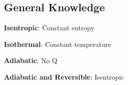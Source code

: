 \documentclass{article}
\begin{document}
\begin{multicols}{3}

    \section*{General Knowledge}
    \textbf{Isentropic}: Constant entropy\par 
    \textbf{Isothermal}: Constant temperature\par 
    \textbf{Adiabatic}: No Q\par 
    \textbf{Adiabatic and Reversible}: Isentropic\par


\end{multicols}  
\end{document}
